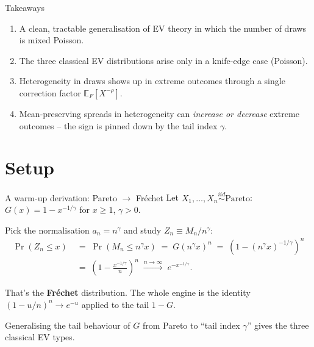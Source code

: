 \documentclass[aspectratio=169,xcolor=dvipsnames]{beamer}
\begin{document}
\begin{frame}{Takeaways}
    \begin{enumerate}
        \item A clean, tractable generalisation of EV theory in which the number of draws is mixed Poisson.
        \vspace{2mm}
        \item The three classical EV distributions arise only in a knife-edge case (Poisson).
        \vspace{2mm}
        \item Heterogeneity in draws shows up in extreme outcomes through a single correction factor $\mathbb{E}_F[X^{-\rho}]$.
        \vspace{2mm}
        \item Mean-preserving spreads in heterogeneity can \emph{increase or decrease} extreme outcomes -- the sign is pinned down by the tail index $\gamma$.
    \end{enumerate}
\end{frame}

\section{Setup}
\begin{frame}{A warm-up derivation: Pareto $\to$ Fr\'echet}
    Let $X_1,\dots,X_n \overset{iid}{\sim} \text{Pareto}$: $G(x) = 1 - x^{-1/\gamma}$ for $x\ge 1$, $\gamma>0$.

    \vspace{2mm}
    Pick the normalisation $a_n = n^\gamma$ and study $Z_n \equiv M_n / n^\gamma$:
    \begin{align*}
        \Pr(Z_n \le x)
        \;&=\; \Pr(M_n \le n^\gamma x)
        \;=\; G(n^\gamma x)^n
        \;=\; \left(1 - (n^\gamma x)^{-1/\gamma}\right)^n \\[1mm]
        \;&=\; \left(1 - \tfrac{x^{-1/\gamma}}{n}\right)^n
        \;\xrightarrow{n\to\infty}\; e^{-x^{-1/\gamma}}.
    \end{align*}
    \vspace{1mm}

    That's the \textbf{Fr\'echet} distribution. The whole engine is the identity $(1-u/n)^n \to e^{-u}$ applied to the tail $1-G$.

    \vspace{2mm}
    Generalising the tail behaviour of $G$ from Pareto to ``tail index $\gamma$'' gives the three classical EV types.
\end{frame}
\end{document}
